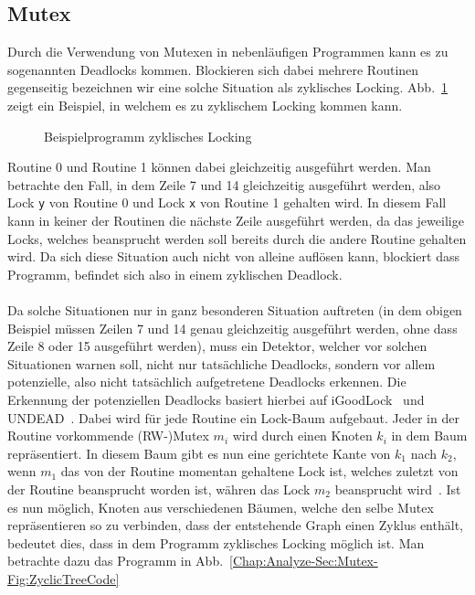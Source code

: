 \subsection{Mutex}
Durch die Verwendung von Mutexen in nebenläufigen Programmen kann es 
zu sogenannten Deadlocks kommen. Blockieren sich dabei mehrere Routinen 
gegenseitig bezeichnen wir eine solche Situation als zyklisches Locking.
Abb.~\ref{Chap:Analyze-Sec:Mutex-Fig:Zyclic} zeigt ein Beispiel, in welchem es zu zyklischem 
Locking kommen kann.
\begin{figure}[h!]
  
  \caption{Beispielprogramm zyklisches Locking}
  \label{Chap:Analyze-Sec:Mutex-Fig:Zyclic}
\end{figure}
Routine 0 und Routine 1 können dabei gleichzeitig ausgeführt werden. Man betrachte den Fall, in dem 
Zeile 7 und 14 gleichzeitig ausgeführt werden, also Lock \texttt{y} von Routine 0 und Lock \texttt{x} 
von Routine 1 gehalten wird. In diesem Fall kann in keiner der Routinen die nächste Zeile ausgeführt werden,
da das jeweilige Locks, welches beansprucht werden soll bereits durch die andere Routine gehalten wird. 
Da sich diese Situation auch nicht von alleine auflösen kann, blockiert dass Programm, befindet sich also 
in einem zyklischen Deadlock.\\\\
Da solche Situationen nur in ganz besonderen Situation auftreten (in dem obigen Beispiel müssen Zeilen 
7 und 14 genau gleichzeitig ausgeführt werden, ohne dass Zeile 8 oder 15 ausgeführt werden), muss 
ein Detektor, welcher vor solchen Situationen warnen soll, nicht nur tatsächliche Deadlocks, sondern
vor allem potenzielle, also nicht tatsächlich aufgetretene Deadlocks erkennen. Die Erkennung der 
potenziellen Deadlocks basiert hierbei auf iGoodLock~\cite{iGoodLock} und UNDEAD~\cite{Undead}. 
Dabei wird für jede Routine ein Lock-Baum aufgebaut. Jeder in der Routine vorkommende 
(RW-)Mutex $m_i$ wird durch einen Knoten $k_i$ in dem Baum repräsentiert. 
In diesem Baum gibt es nun eine gerichtete Kante von $k_1$ nach $k_2$, wenn 
$m_1$ das
von der Routine momentan gehaltene Lock ist, welches zuletzt von der Routine 
beansprucht worden ist, währen das Lock $m_2$ beansprucht wird~\cite{lock-tree}.
Ist es nun möglich, Knoten aus verschiedenen Bäumen, welche den selbe
Mutex repräsentieren so zu verbinden, dass der entstehende Graph einen Zyklus 
enthält, bedeutet dies, dass in dem Programm zyklisches Locking möglich ist. 
Man betrachte dazu das Programm in Abb.~\ref{Chap:Analyze-Sec:Mutex-Fig:ZyclicTreeCode}
